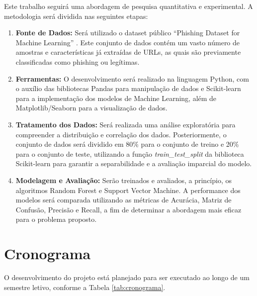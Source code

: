 \documentclass[12pt]{article}
\begin{document}
Este trabalho seguirá uma abordagem de pesquisa quantitativa e experimental. A metodologia será dividida nas seguintes etapas:

\begin{enumerate}
    \item \textbf{Fonte de Dados:} Será utilizado o dataset público ``Phishing Dataset for Machine Learning'' \parencite{kaggle_dataset_2022}. Este conjunto de dados contém um vasto número de amostras e características já extraídas de URLs, as quais são previamente classificadas como phishing ou legítimas.

    \item \textbf{Ferramentas:} O desenvolvimento será realizado na linguagem Python, com o auxílio das bibliotecas Pandas para manipulação de dados e Scikit-learn \parencite{scikit-learn} para a implementação dos modelos de Machine Learning, além de Matplotlib/Seaborn para a visualização de dados.

    \item \textbf{Tratamento dos Dados:} Será realizada uma análise exploratória para compreender a distribuição e correlação dos dados. Posteriormente, o conjunto de dados será dividido em 80\% para o conjunto de treino e 20\% para o conjunto de teste, utilizando a função \textit{train\_test\_split} da biblioteca Scikit-learn para garantir a separabilidade e a avaliação imparcial do modelo.

    \item \textbf{Modelagem e Avaliação:} Serão treinados e avaliados, a princípio, os algoritmos Random Forest e Support Vector Machine. A performance dos modelos será comparada utilizando as métricas de Acurácia, Matriz de Confusão, Precisão e Recall, a fim de determinar a abordagem mais eficaz para o problema proposto.
\end{enumerate}


\section{Cronograma}
\label{sec:cronograma}
O desenvolvimento do projeto está planejado para ser executado ao longo de um semestre letivo, conforme a Tabela \ref{tab:cronograma}.
\end{document}
